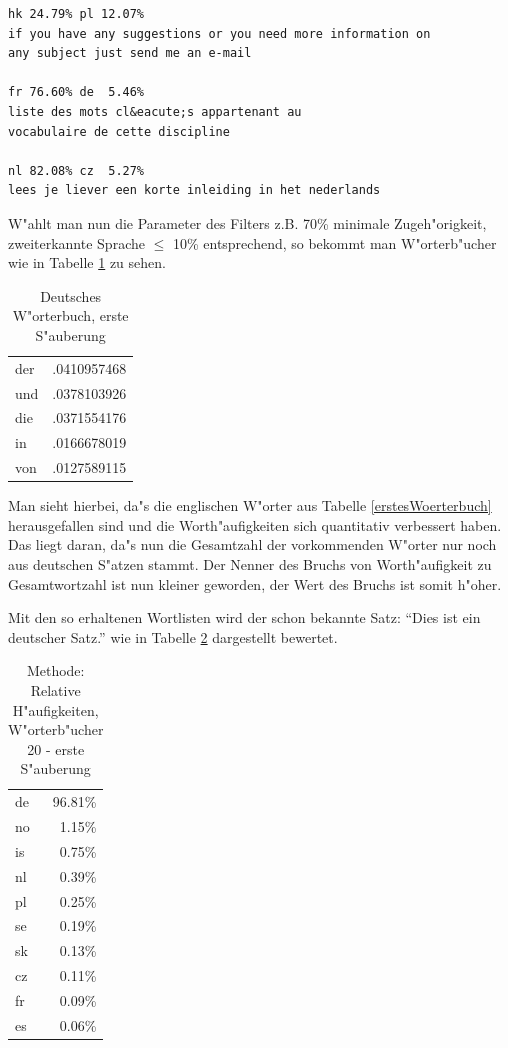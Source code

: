 \begin{enumerate}
\begin{verbatim}
hk 24.79% pl 12.07% 
if you have any suggestions or you need more information on
any subject just send me an e-mail

fr 76.60% de  5.46%
liste des mots cl&eacute;s appartenant au 
vocabulaire de cette discipline

nl 82.08% cz  5.27% 
lees je liever een korte inleiding in het nederlands
\end{verbatim}

W"ahlt man nun die Parameter des Filters z.B. 70\% minimale Zugeh"origkeit, zweiterkannte Sprache $\le$ 10\%  entsprechend, so bekommt man W"orterb"ucher wie in Tabelle \ref{zweitesWoerterbuch} zu sehen.
\end{enumerate}

\begin{table}[t]
\begin{center}
\begin{tabular}{lr}
der      &.0410957468\\
und      &.0378103926\\
die      &.0371554176\\
in       &.0166678019\\
von      &.0127589115\\
\end{tabular}
\end{center}
\caption{Deutsches W"orterbuch, erste S"auberung}
\label{zweitesWoerterbuch}
\end{table}

Man sieht hierbei, da"s die englischen W"orter aus Tabelle \ref{erstesWoerterbuch} herausgefallen sind und die Worth"aufigkeiten sich quantitativ verbessert haben. Das liegt daran, da"s nun die Gesamtzahl der vorkommenden W"orter nur noch aus deutschen S"atzen stammt. Der Nenner des Bruchs von Worth"aufigkeit zu Gesamtwortzahl ist nun kleiner geworden, der Wert des Bruchs ist somit h"oher.

Mit den so erhaltenen Wortlisten wird der schon bekannte Satz: "`Dies ist ein deutscher Satz."' wie in Tabelle \ref{zweiteSpracherkennung} dargestellt bewertet.

\begin{table}[h]
\begin{center}
\begin{tabular}{|l|r|}
\hline
de  &96.81\% \\
no  &1.15\% \\
is  &0.75\% \\
nl  &0.39\% \\
pl  &0.25\% \\
se  &0.19\% \\
sk  &0.13\% \\
cz  &0.11\% \\
fr  &0.09\% \\
es  &0.06\% \\
\hline
\end{tabular}
\end{center}
\caption{Methode: Relative H"aufigkeiten, W"orterb"ucher 20 - erste S"auberung}
\label{zweiteSpracherkennung}
\end{table}


